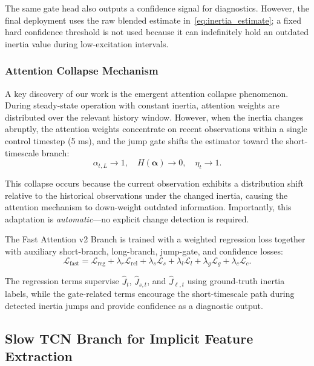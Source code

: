 \documentclass[lettersize,journal]{IEEEtran}
\begin{document}
\noindent The same gate head also outputs a confidence signal for diagnostics. However, the final deployment uses the raw blended estimate in~\eqref{eq:inertia_estimate}; a fixed hard confidence threshold is not used because it can indefinitely hold an outdated inertia value during low-excitation intervals.

\subsubsection{Attention Collapse Mechanism}

A key discovery of our work is the emergent attention collapse phenomenon. During steady-state operation with constant inertia, attention weights are distributed over the relevant history window. However, when the inertia changes abruptly, the attention weights concentrate on recent observations within a single control timestep (5 ms), and the jump gate shifts the estimator toward the short-timescale branch:
\begin{equation}
\alpha_{t,L} \rightarrow 1, \quad H(\bm{\alpha}) \rightarrow 0, \quad \eta_t \rightarrow 1.
\label{eq:attention_collapse}
\end{equation}

This collapse occurs because the current observation exhibits a distribution shift relative to the historical observations under the changed inertia, causing the attention mechanism to down-weight outdated information. Importantly, this adaptation is \emph{automatic}—no explicit change detection is required.

The Fast Attention v2 Branch is trained with a weighted regression loss together with auxiliary short-branch, long-branch, jump-gate, and confidence losses:
\begin{equation}
\mathcal{L}_{\text{fast}} =
\mathcal{L}_{\text{reg}} + \lambda_r \mathcal{L}_{\text{rel}}
+ \lambda_s \mathcal{L}_{s} + \lambda_l \mathcal{L}_{l}
+ \lambda_g \mathcal{L}_{g} + \lambda_c \mathcal{L}_{c}.
\label{eq:fast_loss}
\end{equation}

\noindent The regression terms supervise $\hat{J}_t$, $\hat{J}_{s,t}$, and $\hat{J}_{\ell,t}$ using ground-truth inertia labels, while the gate-related terms encourage the short-timescale path during detected inertia jumps and provide confidence as a diagnostic output.

\subsection{Slow TCN Branch for Implicit Feature Extraction}
\end{document}
